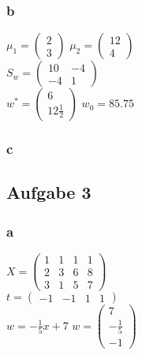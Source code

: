 \documentclass{article}
\begin{document}
	\subsubsection{b}
	
	
	$\mu_{1} = 
		\begin{pmatrix}
			2\\
			3
		\end{pmatrix}$
	$\mu_{2} = 
		\begin{pmatrix}
			12\\
			4
		\end{pmatrix}$
	\\
	$S_w = 
		\begin{pmatrix}
			10 & -4\\
			-4 & 1
		\end{pmatrix}
	$
	\\
	$w^* = 
		\begin{pmatrix}
			6\\
			12 \frac{1}{2}
		\end{pmatrix}$
	$w_{0} = 85.75$
	
	\begin{figure}[h]
	\end{figure}
	
	\subsubsection{c}

\subsection{Aufgabe 3}
	\subsubsection{a}
 		$X= 
		\begin{pmatrix}
			1 & 1 & 1 & 1 \\
			2 & 3 & 6 & 8 \\
			3 & 1 & 5 & 7
		\end{pmatrix}$
		\\
		$t= \begin{pmatrix}
				-1 & -1 & 1 & 1
		\end{pmatrix}$
		\\
		$w = -\frac{1}{5}x + 7$
		$w = \begin{pmatrix}
			7\\
			-\frac{1}{5}\\
			-1
		\end{pmatrix}$
		
\end{document}
